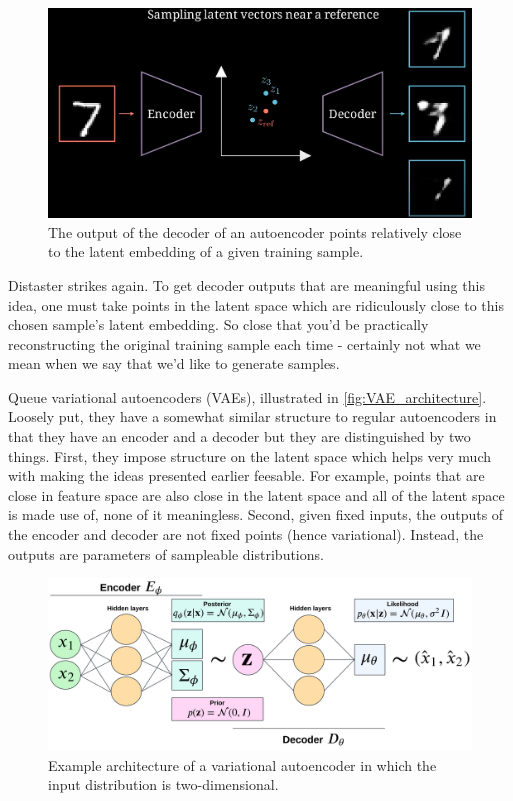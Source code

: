 \documentclass[11pt]{article}
\begin{document}
\begin{figure}[ht]
    \centering
    \includegraphics[width=0.75\columnwidth]{./figures/generative_models/AEs_gen_2.png}
    \caption{\centering The output of the decoder of an autoencoder points relatively close to the latent embedding of a given training sample.}
    \label{fig:autoencoder_generation_2}
\end{figure}

Distaster strikes again. To get decoder outputs that are meaningful using this idea, one must take points in the latent space which are ridiculously close to this chosen sample's latent embedding. So close that you'd be practically reconstructing the original training sample each time - certainly not what we mean when we say that we'd like to generate samples.

Queue variational autoencoders (VAEs), illustrated in \autoref{fig:VAE_architecture}. Loosely put, they have a somewhat similar structure to regular autoencoders in that they have an encoder and a decoder but they are distinguished by two things. First, they impose structure on the latent space which helps very much with making the ideas presented earlier feesable. For example, points that are close in feature space are also close in the latent space and all of the latent space is made use of, none of it meaningless. Second, given fixed inputs, the outputs of the encoder and decoder are not fixed points (hence variational). Instead, the outputs are parameters of sampleable distributions.

\begin{figure}
    \centering
    \includegraphics[width=1\columnwidth]{./figures/generative_models/VAE_handcrafted.pdf}
    \caption{\centering Example architecture of a variational autoencoder in which the input distribution is two-dimensional.}
    \label{fig:VAE_architecture}
\end{figure}
\end{document}
